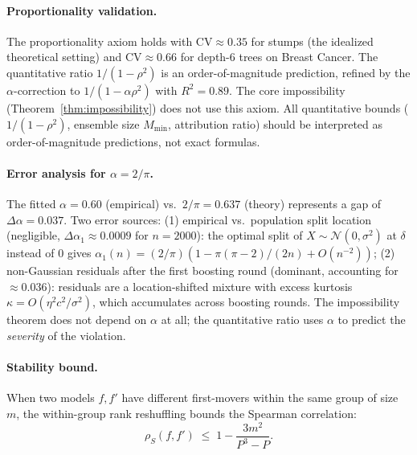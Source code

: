 \documentclass{jmlr}
\begin{document}
\paragraph{Proportionality validation.}
The proportionality axiom holds with CV${\approx}0.35$ for stumps (the idealized theoretical setting) and CV${\approx}0.66$ for depth-6 trees on Breast Cancer. The quantitative ratio $1/(1{-}\rho^2)$ is an order-of-magnitude prediction, refined by the $\alpha$-correction to $1/(1{-}\alpha\rho^2)$ with $R^2 = 0.89$. The core impossibility (Theorem~\ref{thm:impossibility}) does not use this axiom. All quantitative bounds ($1/(1{-}\rho^2)$, ensemble size $M_{\min}$, attribution ratio) should be interpreted as order-of-magnitude predictions, not exact formulas.

\paragraph{Error analysis for $\alpha = 2/\pi$.}
The fitted $\alpha = 0.60$ (empirical) vs.\ $2/\pi = 0.637$ (theory) represents a gap of $\Delta\alpha = 0.037$. Two error sources: (1) empirical vs.\ population split location (negligible, $\Delta\alpha_1 \approx 0.0009$ for $n = 2000$): the optimal split of $X \sim \mathcal{N}(0, \sigma^2)$ at $\delta$ instead of $0$ gives $\alpha_1(n) = (2/\pi)(1 - \pi(\pi-2)/(2n) + O(n^{-2}))$; (2) non-Gaussian residuals after the first boosting round (dominant, accounting for $\approx 0.036$): residuals are a location-shifted mixture with excess kurtosis $\kappa = O(\eta^2 c^2/\sigma^2)$, which accumulates across boosting rounds. The impossibility theorem does not depend on $\alpha$ at all; the quantitative ratio uses $\alpha$ to predict the \emph{severity} of the violation.

\paragraph{Stability bound.}
When two models $f, f'$ have different first-movers within the same group of size $m$, the within-group rank reshuffling bounds the Spearman correlation:
\[
    \rho_S(f, f') \;\leq\; 1 - \frac{3m^2}{P^3 - P}.
\]
\end{document}
